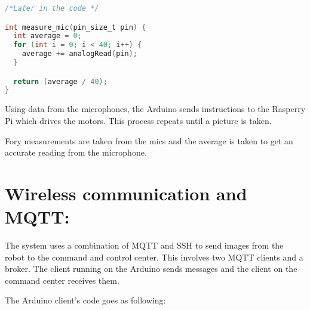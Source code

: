 \documentclass[12pt,a4paper]{article}
\begin{document}
\begin{lstlisting}[language=C, caption=Microphone Code]
/*Later in the code */

int measure_mic(pin_size_t pin) {
  int average = 0;
  for (int i = 0; i < 40; i++) {
    average += analogRead(pin);
  }

  return (average / 40);
}

\end{lstlisting}

Using data from the microphones, the Arduino sends instructions to the Rasperry Pi which drives the motors.
This process repeats until a picture is taken.

Fory measurements are taken from the mics and the average is taken to get an accurate reading from the microphone.

\clearpage

\newpage

\section{  Wireless communication and MQTT: }

The system uses a combination of MQTT and SSH to send images from the robot to the command and control center.
This involves two MQTT clients and a broker. The client running on the Arduino sends messages and the client on the command center receives them.

The Arduino client's code goes as following:
\end{document}
